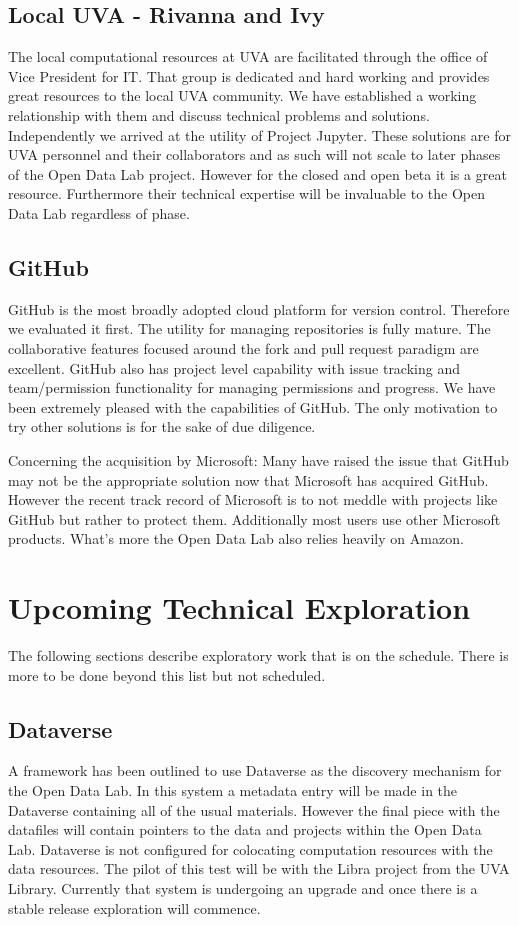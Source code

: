 \subsection{Local UVA - Rivanna and Ivy}
The local computational resources at UVA are facilitated through the office of Vice President for IT. That group is dedicated and hard working and provides great resources to the local UVA community. We have established a working relationship with them and discuss technical problems and solutions. Independently we arrived at the utility of Project Jupyter.
These solutions are for UVA personnel and their collaborators and as such will not scale to later phases of the Open Data Lab project. However for the closed and open beta it is a great resource. Furthermore their technical expertise will be invaluable to the Open Data Lab regardless of phase.

\subsection{GitHub}
GitHub is the most broadly adopted cloud platform for version control. Therefore we evaluated it first. The utility for managing repositories is fully mature. The collaborative features focused around the fork and pull request paradigm are excellent. GitHub also has project level capability with issue tracking and team/permission functionality for managing permissions and progress. We have been extremely pleased with the capabilities of GitHub. The only motivation to try other solutions is for the sake of due diligence.

Concerning the acquisition by Microsoft: Many have raised the issue that GitHub may not be the appropriate solution now that Microsoft has acquired GitHub. However the recent track record of Microsoft is to not meddle with projects like GitHub but rather to protect them. Additionally most users use other Microsoft products. What's more the Open Data Lab also relies heavily on Amazon.

\section{Upcoming Technical Exploration}
The following sections describe exploratory work that is on the schedule. There is more to be done beyond this list but not scheduled.
\subsection{Dataverse}
A framework has been outlined to use Dataverse as the discovery mechanism for the Open Data Lab. In this system a metadata entry will be made in the Dataverse containing all of the usual materials. However the final piece with the datafiles will contain pointers to the data and projects within the Open Data Lab. Dataverse is not configured for colocating computation resources with the data resources. The pilot of this test will be with the Libra project from the UVA Library. Currently that system is undergoing an upgrade and once there is a stable release exploration will commence.
